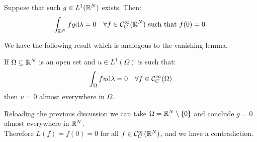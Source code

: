 Suppose that such $g \in L^1(\mathbb R^N)$ exists. Then:
$$\int_{\mathbb R^N} fg \mathrm d \lambda = 0 \quad \forall f \in \mathcal C_C^\infty(\mathbb R^N) \text{ such that } f(0) = 0.$$

We have the following result which is analogous to the vanishing lemma.
\begin{prop}
	If $\Omega \subseteq \mathbb R^N$ is an open set and $u \in L^1(\Omega)$ is such that: $$\int_\Omega f u \mathrm d \lambda = 0 \quad \forall f \in \mathcal C_C^\infty (\Omega)$$
	then $u=0$ almost everywhere in $\Omega$.
\end{prop}

Reloading the previous discussion we can take $\Omega = \mathbb R^N \setminus\{0\}$ and conclude $g=0$ almost everywhere in $\mathbb R^N$.\\
Therefore $L(f) = f(0) = 0$ for all $f \in \mathcal C_C^\infty (\mathbb R^N)$, and we have a contradiction.
